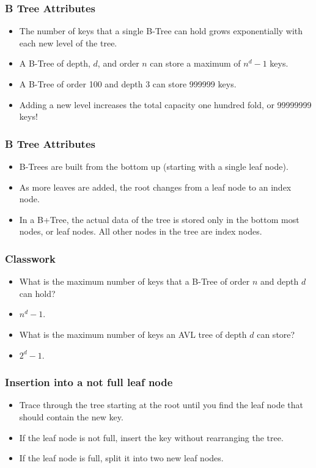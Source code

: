 \documentclass{beamer}
\begin{document}
\begin{frame}
\frametitle{B Tree Attributes}
\begin{itemize}
\item The number of keys that a single B-Tree can hold grows exponentially with each new level of the tree.
\item A B-Tree of depth, $d$, and order $n$ can store a maximum of $n^{d} - 1$ keys.
\item A B-Tree of order 100 and depth 3 can store 999999 keys.
\item Adding a new level increases the total capacity one hundred fold, or 99999999 keys!
\end{itemize}
\end{frame}
\begin{frame}
\frametitle{B Tree Attributes}
\begin{itemize}
\item  B-Trees are built from the bottom up (starting with a single leaf node). 
\item As more leaves are added, the root changes from a leaf node to an index node. 
\item In a B+Tree, the actual data of the tree is stored only in the bottom most nodes, or leaf nodes. All other nodes in the tree are index nodes.
\end{itemize}
\end{frame}
\begin{frame}
\frametitle{Classwork}
\begin{itemize}
\item What is the maximum number of keys that a B-Tree of order $n$ and depth $d$ can hold?
\item<2-> $n^{d}-1$.
\item What is the maximum number of keys an AVL tree of depth $d$ can store?
\item <3-> $2^{d} -1$.
\end{itemize}
\end{frame}

\begin{frame}
\frametitle{Insertion into a not full leaf node}
\begin{itemize}
\item Trace through the tree starting at the root until you find the leaf node that should contain the new key.
\item If the leaf node is not full, insert the key without rearranging the tree.
\item If the leaf node is full, split it into two new leaf nodes.
\end{itemize}
\end{frame}
\end{document}
